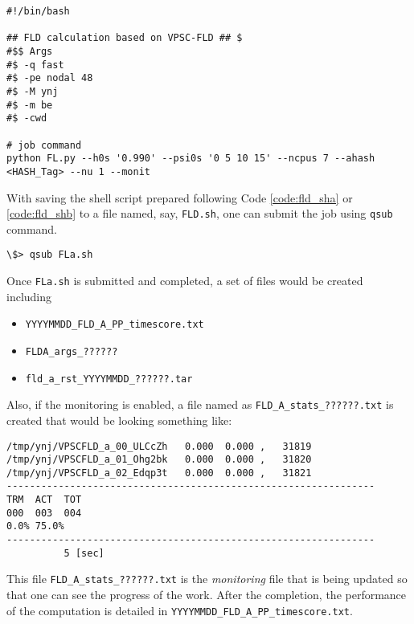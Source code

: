 \documentclass[12pt]{amsart}
\begin{document}
\begin{lstlisting}[style=sh, caption=Shell script that can be submitted to the CTCMS cluster for region \textbf{B} simulations,label={code:fld_shb}]
#!/bin/bash

## FLD calculation based on VPSC-FLD ## $
#$$ Args
#$ -q fast
#$ -pe nodal 48
#$ -M ynj
#$ -m be
#$ -cwd

# job command
python FL.py --h0s '0.990' --psi0s '0 5 10 15' --ncpus 7 --ahash <HASH_Tag> --nu 1 --monit
\end{lstlisting}
With saving the shell script prepared following Code \ref{code:fld_sha} or \ref{code:fld_shb} to a file named, say, \verb$FLD.sh$, one can submit the job using \verb$qsub$ command.
\begin{lstlisting}[style=sh, caption=QSUB]
\$> qsub FLa.sh
\end{lstlisting}
Once \verb$FLa.sh$ is submitted and completed, a set of files would be created including
\begin{itemize}
\item \verb$YYYYMMDD_FLD_A_PP_timescore.txt$
\item \verb$FLDA_args_??????$
\item \verb$fld_a_rst_YYYYMMDD_??????.tar$
\end{itemize}

Also, if the monitoring is enabled, a file named as \verb$FLD_A_stats_??????.txt$ is created that would be looking something like:
\begin{lstlisting}[style=sh, caption=FLD monitor (version 2.1)]
/tmp/ynj/VPSCFLD_a_00_ULCcZh   0.000  0.000 ,   31819
/tmp/ynj/VPSCFLD_a_01_Ohg2bk   0.000  0.000 ,   31820
/tmp/ynj/VPSCFLD_a_02_Edqp3t   0.000  0.000 ,   31821
----------------------------------------------------------------
TRM  ACT  TOT
000  003  004
0.0% 75.0%
----------------------------------------------------------------
          5 [sec]
\end{lstlisting}
This file \verb$FLD_A_stats_??????.txt$ is the {\it monitoring} file that is being updated so that one can see the progress of the work.
After the completion, the performance of the computation is detailed in \verb$YYYYMMDD_FLD_A_PP_timescore.txt$.
\end{document}

